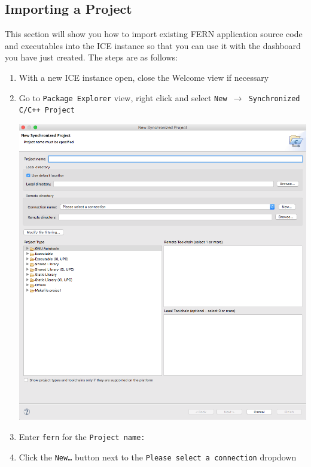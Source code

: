\subsection{Importing a Project}

This section will show you how to import existing FERN application source code
and executables into the ICE instance so that you can use it with the dashboard you
have just created. The steps are as follows:

\begin{enumerate}
\item With a new ICE instance open, close the Welcome view if necessary
\item Go to \texttt{Package Explorer} view, right click and select \texttt{New
$\rightarrow$ Synchronized C/C++ Project}

\begin{center} \includegraphics[width=\textwidth]{figures/newSyncWizard}
\end{center}

\item Enter \texttt{fern} for the \texttt{Project name:}
\item Click the \texttt{New\ldots} button next to the \texttt{Please select a
connection} dropdown


\end{enumerate}
